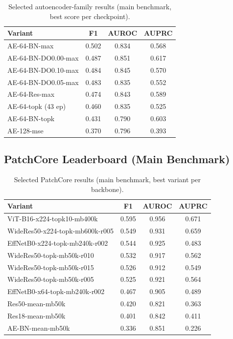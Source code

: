 \documentclass[11pt]{article}
\begin{document}
\begin{table}[H]
\centering
\caption{Selected autoencoder-family results (main benchmark, best score per checkpoint).}
\label{tab:appendix_ae}
\begin{tabular}{lccc}
\toprule
Variant & F1 & AUROC & AUPRC \\
\midrule
AE-64-BN-max              & 0.502 & 0.834 & 0.568 \\
AE-64-BN-DO0.00-max       & 0.487 & 0.851 & 0.617 \\
AE-64-BN-DO0.10-max       & 0.484 & 0.845 & 0.570 \\
AE-64-BN-DO0.05-max       & 0.483 & 0.835 & 0.552 \\
AE-64-Res-max             & 0.474 & 0.843 & 0.589 \\
AE-64-topk (43 ep)        & 0.460 & 0.835 & 0.525 \\
AE-64-BN-topk             & 0.431 & 0.790 & 0.603 \\
AE-128-mse                & 0.370 & 0.796 & 0.393 \\
\bottomrule
\end{tabular}
\end{table}

\subsection{PatchCore Leaderboard (Main Benchmark)}

\begin{table}[H]
\centering
\caption{Selected PatchCore results (main benchmark, best variant per backbone).}
\label{tab:appendix_patchcore}
\begin{tabular}{lccc}
\toprule
Variant & F1 & AUROC & AUPRC \\
\midrule
ViT-B16-x224-topk10-mb400k      & 0.595 & 0.956 & 0.671 \\
WideRes50-x224-topk-mb600k-r005 & 0.549 & 0.931 & 0.659 \\
EffNetB0-x224-topk-mb240k-r002  & 0.544 & 0.925 & 0.483 \\
WideRes50-topk-mb50k-r010       & 0.532 & 0.917 & 0.562 \\
WideRes50-topk-mb50k-r015       & 0.526 & 0.912 & 0.549 \\
WideRes50-topk-mb50k-r005       & 0.525 & 0.921 & 0.564 \\
EffNetB0-x64-topk-mb240k-r002   & 0.467 & 0.905 & 0.489 \\
Res50-mean-mb50k                & 0.420 & 0.821 & 0.363 \\
Res18-mean-mb50k                & 0.401 & 0.842 & 0.411 \\
AE-BN-mean-mb50k                & 0.336 & 0.851 & 0.226 \\
\bottomrule
\end{tabular}
\end{table}
\end{document}
